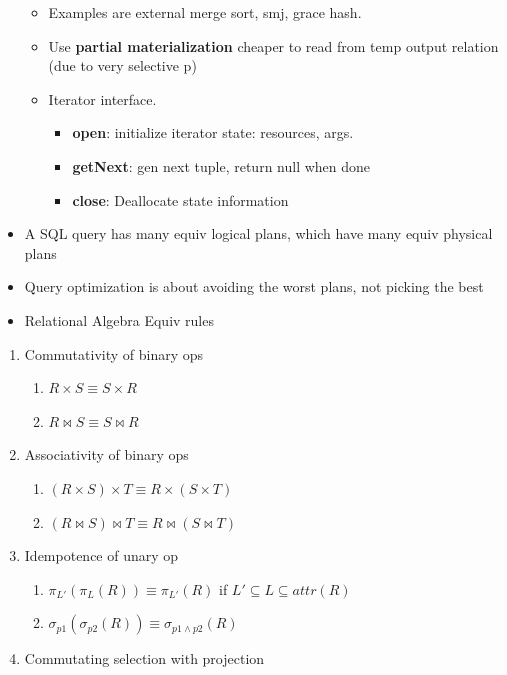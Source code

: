 \documentclass[8pt, landscape]{extarticle}
\begin{document}
\begin{multicols*}{4}
\begin{itemize}
\begin{itemize}
      \item Examples are external merge sort, smj, grace hash.
      \item Use \textbf{partial materialization} cheaper to read from temp output relation (due to very selective p)
      \item Iterator interface.
      \begin{itemize}
        \item \textbf{open}: initialize iterator state: resources, args.
        \item \textbf{getNext}: gen next tuple, return null when done
        \item \textbf{close}: Deallocate state information
      \end{itemize}
    \end{itemize}
    \item A SQL query has many equiv logical plans, which have many equiv physical plans
    \item Query optimization is about avoiding the worst plans, not picking the best
    \item Relational Algebra Equiv rules
  \end{itemize}
    \begin{enumerate}
      \item Commutativity of binary ops
      \begin{enumerate}
        \item $R \times S \equiv S \times R$
        \item $R \bowtie S \equiv S \bowtie R$ 
      \end{enumerate}
      \item Associativity of binary ops
      \begin{enumerate}
        \item $(R \times S) \times T \equiv R \times (S \times T)$
        \item $(R \bowtie S) \bowtie T \equiv R \bowtie (S \bowtie T)$
      \end{enumerate}
      \item Idempotence of unary op
      \begin{enumerate}
        \item $\pi_{L'}(\pi_{L}(R)) \equiv \pi_{L'}(R)$ if $L' \subseteq L \subseteq attr(R)$
        \item $\sigma_{p1}(\sigma_{p2}(R)) \equiv \sigma_{p1 \wedge p2}(R)$
      \end{enumerate}
      \item Commutating selection with projection

\end{enumerate}
\end{multicols*}
\end{document}
